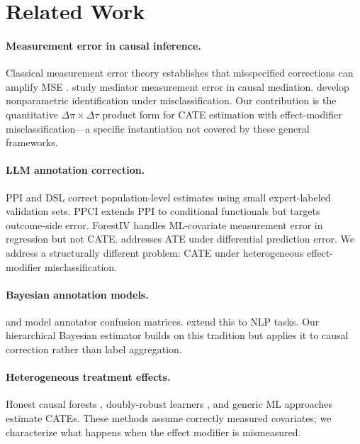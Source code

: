 \documentclass[11pt]{article}
\begin{document}
\section{Related Work}
\label{sec:related}

\paragraph{Measurement error in causal inference.}
Classical measurement error theory establishes that misspecified corrections can amplify MSE \citep{fuller1987measurement,carroll2006measurement,gustafson2003measurement}.
\citet{imai2010causal} study mediator measurement error in causal mediation.
\citet{hu2008instrumental} develop nonparametric identification under misclassification.
Our contribution is the quantitative $\Delta\pi \times \Delta\tau$ product form for CATE estimation with effect-modifier misclassification---a specific instantiation not covered by these general frameworks.

\paragraph{LLM annotation correction.}
PPI \citep{angelopoulos2023prediction} and DSL \citep{egami2024using} correct population-level estimates using small expert-labeled validation sets.
PPCI \citep{sui2026ppci} extends PPI to conditional functionals but targets outcome-side error.
ForestIV \citep{bu2023forestly} handles ML-covariate measurement error in regression but not CATE.
\citet{mozer2026bias} addresses ATE under differential prediction error.
We address a structurally different problem: CATE under heterogeneous effect-modifier misclassification.

\paragraph{Bayesian annotation models.}
\citet{dawid1979maximum} and \citet{passonneau2014benefits} model annotator confusion matrices.
\citet{hovy2013learning} extend this to NLP tasks.
Our hierarchical Bayesian estimator builds on this tradition but applies it to causal correction rather than label aggregation.

\paragraph{Heterogeneous treatment effects.}
Honest causal forests \citep{wager2018estimation,athey2019generalized}, doubly-robust learners \citep{kennedy2023towards}, and generic ML approaches \citep{chernozhukov2018double} estimate CATEs.
These methods assume correctly measured covariates; we characterize what happens when the effect modifier is mismeasured.
\end{document}

